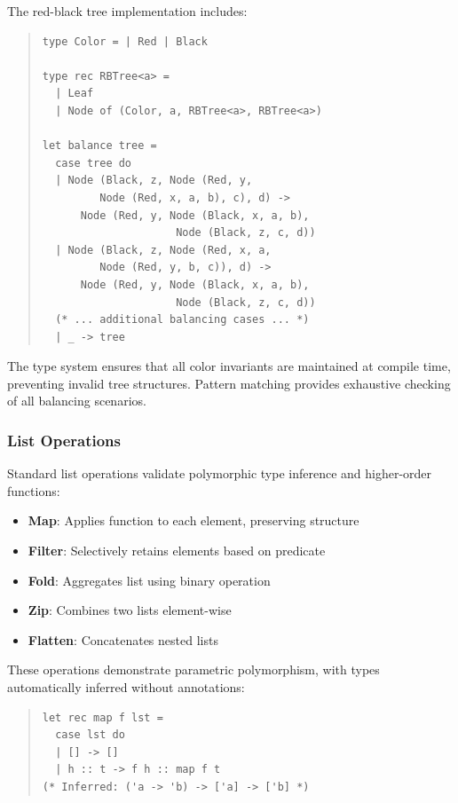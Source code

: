 \documentclass[conference,onecolumn]{IEEEtran}
\begin{document}
The red-black tree implementation includes:

\begin{quote}
\small
\begin{verbatim}
type Color = | Red | Black

type rec RBTree<a> =
  | Leaf
  | Node of (Color, a, RBTree<a>, RBTree<a>)

let balance tree =
  case tree do
  | Node (Black, z, Node (Red, y, 
         Node (Red, x, a, b), c), d) ->
      Node (Red, y, Node (Black, x, a, b),
                     Node (Black, z, c, d))
  | Node (Black, z, Node (Red, x, a, 
         Node (Red, y, b, c)), d) ->
      Node (Red, y, Node (Black, x, a, b),
                     Node (Black, z, c, d))
  (* ... additional balancing cases ... *)
  | _ -> tree
\end{verbatim}
\end{quote}

The type system ensures that all color invariants are maintained at compile time, preventing invalid tree structures. Pattern matching provides exhaustive checking of all balancing scenarios.

\subsubsection{List Operations}

Standard list operations validate polymorphic type inference and higher-order functions:

\begin{itemize}
\item \textbf{Map}: Applies function to each element, preserving structure
\item \textbf{Filter}: Selectively retains elements based on predicate
\item \textbf{Fold}: Aggregates list using binary operation
\item \textbf{Zip}: Combines two lists element-wise
\item \textbf{Flatten}: Concatenates nested lists
\end{itemize}

These operations demonstrate parametric polymorphism, with types automatically inferred without annotations:

\begin{quote}
\small
\begin{verbatim}
let rec map f lst =
  case lst do
  | [] -> []
  | h :: t -> f h :: map f t
(* Inferred: ('a -> 'b) -> ['a] -> ['b] *)
\end{verbatim}
\end{quote}
\end{document}
